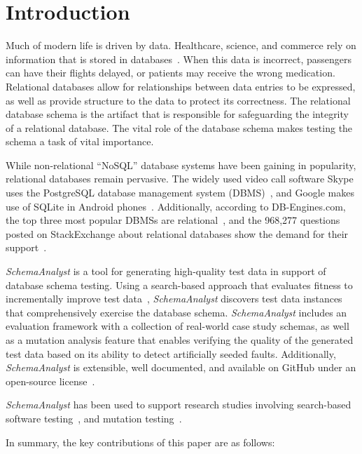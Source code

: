 \section{Introduction}\label{sec:intro}

Much of modern life is driven by data.  Healthcare, science, and commerce rely on information that is
stored in databases~\cite{kapfhammer2007comprehensive}.  When this data is incorrect, passengers can have
their flights delayed, or patients may receive the wrong medication. 
Relational databases allow for relationships between data entries to be expressed, as well as provide structure to 
the data to protect its correctness. The relational database schema is the artifact
that is responsible for safeguarding the integrity of a relational database. The vital role of the database
schema makes testing the schema a task of vital importance.

While non-relational ``NoSQL'' database systems have been gaining in popularity, relational databases remain
pervasive. The widely used video call software Skype uses the PostgreSQL database management system
(DBMS)~\cite{postgres},
and Google makes use of SQLite in Android phones~\cite{sqlite}.
Additionally, according to DB-Engines.com, the top three most popular DBMSs are 
relational~\cite{dbrank}, and the 968,277 questions posted on StackExchange 
about relational databases show the demand for their support~\cite{stackexchange}.

\textit{SchemaAnalyst} is a tool for generating high-quality test data in support of database schema
testing. Using a search-based approach that evaluates fitness to incrementally improve test data~\cite{Korel:AVM},
\textit{SchemaAnalyst} discovers test data instances that comprehensively exercise the database schema.
\textit{SchemaAnalyst} includes an evaluation framework
with a collection of real-world case study schemas, as well as a mutation analysis feature
that enables verifying the quality of the generated test data based on its ability to detect artificially
seeded faults. Additionally, \textit{SchemaAnalyst}
is extensible, well documented, and available on GitHub under an open-source license~\cite{tool}.

\textit{SchemaAnalyst} has been used to support research studies involving search-based
software testing~\cite{kapfhammer2013search,mcminn2015effectiveness,kinneer2015automatically}, and
mutation testing~\cite{wright2013efficient,wright2014impact,wright2015mutation,mcminn2016virtual}.

In summary, the key contributions of this paper are as follows:

